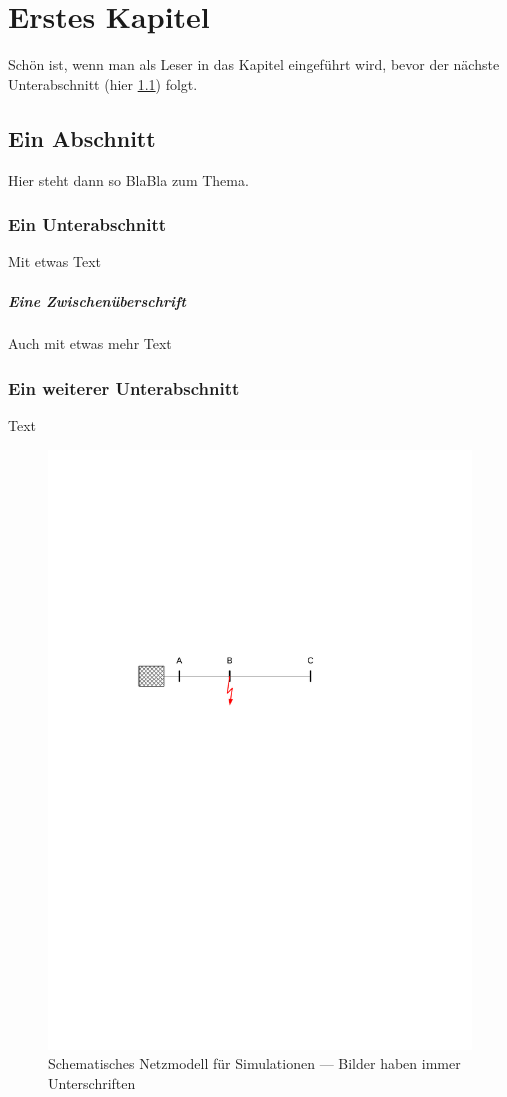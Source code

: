 
\chapter{Erstes Kapitel}
Schön ist, wenn man als Leser in das Kapitel eingeführt wird, bevor
der nächste Unterabschnitt (hier \ref{abs:erster}) folgt.

\section{Ein Abschnitt}\label{abs:erster}
Hier steht dann so BlaBla zum Thema.

\subsection{Ein Unterabschnitt}
Mit etwas Text

\paragraph{Eine Zwischenüberschrift}
Auch mit etwas mehr Text

\subsection{Ein weiterer Unterabschnitt}\label{abs:naja}
Text

\begin{figure}[ht!]
 \centering
 \includegraphics[width=.6\textwidth]{Inhalt/Abbildungen/Bild_Visio.pdf}
 \caption{Schematisches Netzmodell für Simulationen --- Bilder haben immer Unterschriften}
 \label{fig:leitungsmodell}
\end{figure}

